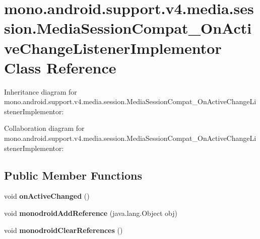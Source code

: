 \hypertarget{classmono_1_1android_1_1support_1_1v4_1_1media_1_1session_1_1_media_session_compat___on_active_change_listener_implementor}{}\section{mono.\+android.\+support.\+v4.\+media.\+session.\+Media\+Session\+Compat\+\_\+\+On\+Active\+Change\+Listener\+Implementor Class Reference}
\label{classmono_1_1android_1_1support_1_1v4_1_1media_1_1session_1_1_media_session_compat___on_active_change_listener_implementor}


Inheritance diagram for mono.\+android.\+support.\+v4.\+media.\+session.\+Media\+Session\+Compat\+\_\+\+On\+Active\+Change\+Listener\+Implementor\+:


Collaboration diagram for mono.\+android.\+support.\+v4.\+media.\+session.\+Media\+Session\+Compat\+\_\+\+On\+Active\+Change\+Listener\+Implementor\+:
\subsection*{Public Member Functions}
\begin{DoxyCompactItemize}
\item 
\mbox{\label{classmono_1_1android_1_1support_1_1v4_1_1media_1_1session_1_1_media_session_compat___on_active_change_listener_implementor_a0672dc8fe59e6c7a18b1755ca87be36d}} 
void {\bfseries on\+Active\+Changed} ()
\item 
\mbox{\label{classmono_1_1android_1_1support_1_1v4_1_1media_1_1session_1_1_media_session_compat___on_active_change_listener_implementor_a01e79fbddef692a8bb55ae13792dc8c4}} 
void {\bfseries monodroid\+Add\+Reference} (java.\+lang.\+Object obj)
\item 
\mbox{\label{classmono_1_1android_1_1support_1_1v4_1_1media_1_1session_1_1_media_session_compat___on_active_change_listener_implementor_a9734f63b8b6ae5e64326da1f4b548bda}} 
void {\bfseries monodroid\+Clear\+References} ()
\end{DoxyCompactItemize}

